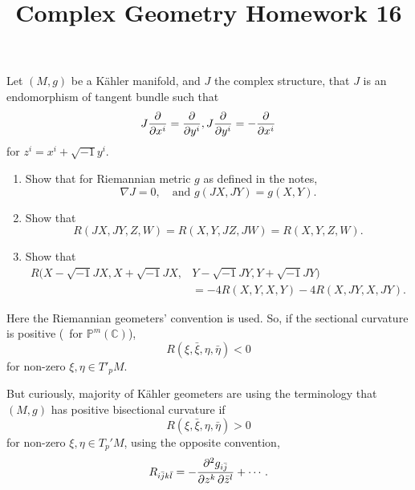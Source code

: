 \documentclass[12pt]{article}
\title{Complex Geometry Homework 16}
\author{}
\date{}
\begin{document}
\maketitle
\begin{problem}
  Let \((M,g)\) be a K\"ahler manifold, and \(J\) the complex structure, that
  \(J\) is an endomorphism of tangent bundle such that \[
    J\pdv{}{x^i}=\pdv{}{y^i},J\pdv{}{y^i}=-\pdv{}{x^i}
  \] for \(z^i=x^i+\sqrt{-1}y^i\).
  \begin{enumerate}[(1)]
  \item Show that for Riemannian metric \(g\) as defined in the notes, \[
    \nabla J=0,\quad \text{and }g(JX,JY)=g(X,Y)
  .\] 
  \item Show that \[
    R(JX,JY,Z,W)=R(X,Y,JZ,JW)=R(X,Y,Z,W)
  .\] 
  \item Show that
  \begin{align*}
    R(X-\sqrt{-1}JX,X+\sqrt{-1}JX,&Y-\sqrt{-1}JY,Y+\sqrt{-1}JY) \\
    &=-4R(X,Y,X,Y)-4R(X,JY,X,JY)
  .\end{align*}
  \end{enumerate}
  Here the Riemannian geometers' convention is used. So, if the
  sectional curvature is positive (\ie\ for \(\mathbb{P}^m(\mathbb{C})\)), \[
    R(\xi,\bar{\xi},\eta,\bar{\eta})<0
  \] for non-zero \(\xi,\eta\in T'_p M\).

  But curiously, majority of K\"ahler geometers are using the terminology that
  \((M,g)\) has positive bisectional curvature if \[
    R(\xi,\bar{\xi},\eta,\bar{\eta})>0
  \] for non-zero \(\xi,\eta\in T_p' M\), using the opposite convention, \ie\ \[
    R_{i\bar{j}k\bar{l}}=-\pdv{g_{i\bar{j}}}{z^k,\bar{z}^l}+\cdots
  .\]
\end{problem}
\end{document}
